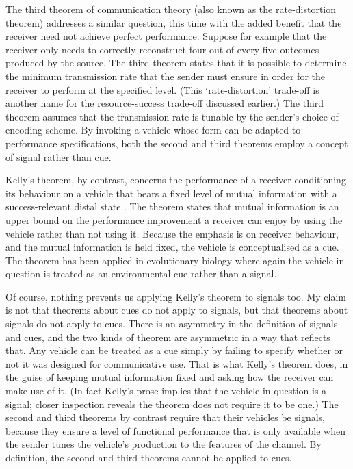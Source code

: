 \documentclass[12pt]{article}
\begin{document}
The third theorem of communication theory (also known as the rate-distortion theorem) addresses a similar question, this time with the added benefit that the receiver need not achieve perfect performance.
Suppose for example that the receiver only needs to correctly reconstruct four out of every five outcomes produced by the source.
The third theorem states that it is possible to determine the minimum transmission rate that the sender must ensure in order for the receiver to perform at the specified level.
(This `rate-distortion' trade-off is another name for the resource-success trade-off discussed earlier.)
The third theorem assumes that the transmission rate is tunable by the sender's choice of encoding scheme.
By invoking a vehicle whose form can be adapted to performance specifications, both the second and third theorems employ a concept of signal rather than cue.

Kelly's theorem, by contrast, concerns the performance of a receiver conditioning its behaviour on a vehicle that bears a fixed level of mutual information with a success-relevant distal state \citep{kelly1956new}.
The theorem states that mutual information is an upper bound on the performance improvement a receiver can enjoy by using the vehicle rather than not using it.
Because the emphasis is on receiver behaviour, and the mutual information is held fixed, the vehicle is conceptualised as a cue.
The theorem has been applied in evolutionary biology \citep{donaldson-matasci2010fitness} where again the vehicle in question is treated as an environmental cue rather than a signal.

Of course, nothing prevents us applying Kelly's theorem to signals too.
My claim is not that theorems about cues do not apply to signals, but that theorems about signals do not apply to cues.
There is an asymmetry in the definition of signals and cues, and the two kinds of theorem are asymmetric in a way that reflects that.
Any vehicle can be treated as a cue simply by failing to specify whether or not it was designed for communicative use.
That is what Kelly's theorem does, in the guise of keeping mutual information fixed and asking how the receiver can make use of it.
(In fact Kelly's prose implies that the vehicle in question is a signal; closer inspection reveals the theorem does not require it to be one.)
The second and third theorems by contrast require that their vehicles be signals, because they ensure a level of functional performance that is only available when the sender tunes the vehicle's production to the features of the channel.
By definition, the second and third theorems cannot be applied to cues.
\end{document}
